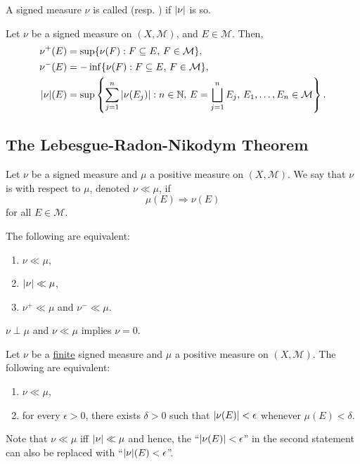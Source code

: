 \documentclass[12pt]{article}	%
\begin{document}
A signed measure $\nu$ is called  (resp. ) if ${\left\lvert \nu \right\lvert}$ is so.

\begin{prop}
	Let $\nu$ be a signed measure on $(X, \mathcal{M})$, and $E \in \mathcal{M}$. Then,
	\begin{align*} 
		\nu^{+}(E) &= \sup\{\nu(F) : F \subseteq E,\, F \in \mathcal{M}\}, \\
		\nu^{-}(E) &= -\inf\{\nu(F) : F \subseteq E,\, F \in \mathcal{M}\}, \\
		{\left\lvert \nu \right\lvert}(E) &= \sup\left\{\sum_{j = 1}^{n} {\left\lvert \nu(E_{j}) \right\lvert} : n \in \mathbb{N},\, E = \bigsqcup_{j = 1}^{n} E_{j},\, E_{1}, \ldots, E_{n} \in \mathcal{M}\right\}.
	\end{align*}
\end{prop}

\subsection{The Lebesgue-Radon-Nikodym Theorem}

\begin{defn}
	Let $\nu$ be a signed measure and $\mu$ a positive measure on $(X, \mathcal{M})$. We say that $\nu$ is  with respect to $\mu$, denoted $\nu \ll \mu$, if
	\begin{equation*} 
		\mu(E) \Rightarrow \nu(E)
	\end{equation*}
	for all $E \in \mathcal{M}$.
\end{defn}

\begin{exe}
	The following are equivalent:
	\begin{enumerate}
		\item $\nu \ll \mu$,
		\item ${\left\lvert \nu \right\lvert} \ll \mu$,
		\item $\nu^{+} \ll \mu$ and $\nu^{-} \ll \mu$.
	\end{enumerate}
\end{exe}
\begin{exe}
	$\nu \perp \mu$ and $\nu \ll \mu$ implies $\nu = 0$.
\end{exe}

\begin{thm}
	Let $\nu$ be a \underline{finite} signed measure and $\mu$ a positive measure on $(X, \mathcal{M})$. The following are equivalent:
	\begin{enumerate}
	 	\item $\nu \ll \mu$,
	 	\item for every $\epsilon > 0$, there exists $\delta > 0$ such that ${\left\lvert \nu(E) \right\lvert} < \epsilon$ whenever $\mu(E) < \delta$.
	 \end{enumerate} 
\end{thm}
Note that $\nu \ll \mu$ iff ${\left\lvert \nu \right\lvert} \ll \mu$ and hence, the ``${\left\lvert \nu(E) \right\lvert} < \epsilon$'' in the second statement can also be replaced with ``${\left\lvert \nu \right\lvert}(E) < \epsilon$''.
\end{document}
